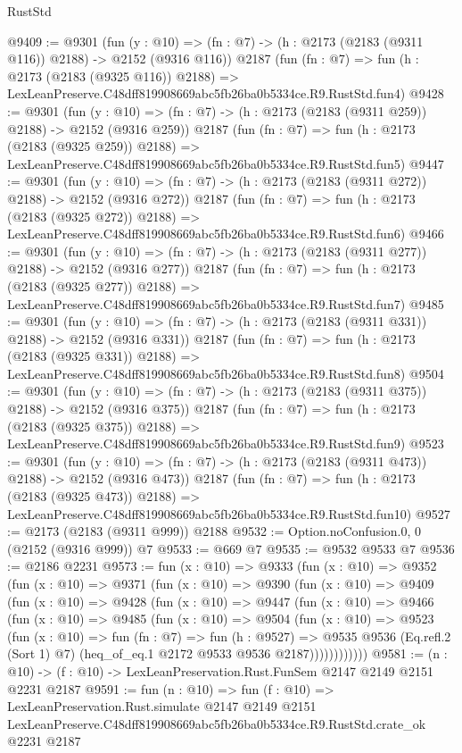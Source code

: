 \begin{lexlean}{RustStd}
\begin{coremodule}
@9409 := @9301
    (fun (y : @10) => (fn : @7) -> (h : @2173 (@2183 (@9311 @116)) @2188) -> @2152 (@9316 @116))
    @2187
    (fun (fn : @7) =>
    fun (h : @2173 (@2183 (@9325 @116)) @2188) =>
    LexLeanPreserve.C48dff819908669abc5fb26ba0b5334ce.R9.RustStd.fun4)
@9428 := @9301
    (fun (y : @10) => (fn : @7) -> (h : @2173 (@2183 (@9311 @259)) @2188) -> @2152 (@9316 @259))
    @2187
    (fun (fn : @7) =>
    fun (h : @2173 (@2183 (@9325 @259)) @2188) =>
    LexLeanPreserve.C48dff819908669abc5fb26ba0b5334ce.R9.RustStd.fun5)
@9447 := @9301
    (fun (y : @10) => (fn : @7) -> (h : @2173 (@2183 (@9311 @272)) @2188) -> @2152 (@9316 @272))
    @2187
    (fun (fn : @7) =>
    fun (h : @2173 (@2183 (@9325 @272)) @2188) =>
    LexLeanPreserve.C48dff819908669abc5fb26ba0b5334ce.R9.RustStd.fun6)
@9466 := @9301
    (fun (y : @10) => (fn : @7) -> (h : @2173 (@2183 (@9311 @277)) @2188) -> @2152 (@9316 @277))
    @2187
    (fun (fn : @7) =>
    fun (h : @2173 (@2183 (@9325 @277)) @2188) =>
    LexLeanPreserve.C48dff819908669abc5fb26ba0b5334ce.R9.RustStd.fun7)
@9485 := @9301
    (fun (y : @10) => (fn : @7) -> (h : @2173 (@2183 (@9311 @331)) @2188) -> @2152 (@9316 @331))
    @2187
    (fun (fn : @7) =>
    fun (h : @2173 (@2183 (@9325 @331)) @2188) =>
    LexLeanPreserve.C48dff819908669abc5fb26ba0b5334ce.R9.RustStd.fun8)
@9504 := @9301
    (fun (y : @10) => (fn : @7) -> (h : @2173 (@2183 (@9311 @375)) @2188) -> @2152 (@9316 @375))
    @2187
    (fun (fn : @7) =>
    fun (h : @2173 (@2183 (@9325 @375)) @2188) =>
    LexLeanPreserve.C48dff819908669abc5fb26ba0b5334ce.R9.RustStd.fun9)
@9523 := @9301
    (fun (y : @10) => (fn : @7) -> (h : @2173 (@2183 (@9311 @473)) @2188) -> @2152 (@9316 @473))
    @2187
    (fun (fn : @7) =>
    fun (h : @2173 (@2183 (@9325 @473)) @2188) =>
    LexLeanPreserve.C48dff819908669abc5fb26ba0b5334ce.R9.RustStd.fun10)
@9527 := @2173 (@2183 (@9311 @999)) @2188
@9532 := Option.noConfusion.{0, 0} (@2152 (@9316 @999)) @7
@9533 := @669 @7
@9535 := @9532 @9533 @7
@9536 := @2186 @2231
@9573 := fun (x : @10) =>
  @9333
    (fun (x : @10) =>
    @9352
      (fun (x : @10) =>
      @9371
        (fun (x : @10) =>
        @9390
          (fun (x : @10) =>
          @9409
            (fun (x : @10) =>
            @9428
              (fun (x : @10) =>
              @9447
                (fun (x : @10) =>
                @9466
                  (fun (x : @10) =>
                  @9485
                    (fun (x : @10) =>
                    @9504
                      (fun (x : @10) =>
                      @9523
                        (fun (x : @10) =>
                        fun (fn : @7) =>
                        fun (h : @9527) =>
                        @9535
                          @9536
                          (Eq.refl.{2} (Sort 1) @7)
                          (heq_of_eq.{1} @2172 @9533 @9536 @2187))))))))))))
@9581 := (n : @10) -> (f : @10) -> LexLeanPreservation.Rust.FunSem @2147 @2149 @2151 @2231 @2187
@9591 := fun (n : @10) =>
  fun (f : @10) =>
  LexLeanPreservation.Rust.simulate
    @2147
    @2149
    @2151
    LexLeanPreserve.C48dff819908669abc5fb26ba0b5334ce.R9.RustStd.crate_ok
    @2231
    @2187
\end{coremodule}
\end{lexlean}
